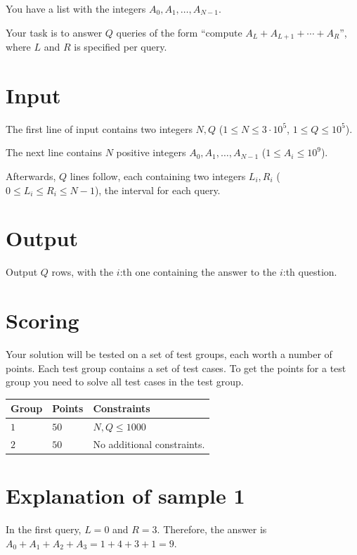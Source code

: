 You have a list with the integers $A_0, A_1, \dots, A_{N-1}$.

Your task is to answer $Q$ queries of the form ``compute $A_L+A_{L+1}+\cdots+A_{R}$'', where $L$ and $R$
is specified per query.

\section*{Input}
The first line of input contains two integers $N, Q$ ($1 \leq N \leq 3 \cdot 10^5$, $1 \leq Q \leq 10^5$).

The next line contains $N$ positive integers $A_0, A_1, \dots, A_{N-1}$ ($1 \leq A_i \leq 10^9$).

Afterwards, $Q$ lines follow, each containing two integers $L_{i},R_{i}$ ($0 \leq L_{i} \leq R_{i} \leq N-1$),
the interval for each query.

\section*{Output}
Output $Q$ rows, with the $i$:th one containing the answer to the $i$:th question.

\section*{Scoring}
Your solution will be tested on a set of test groups, each worth a number of points. Each test group contains
a set of test cases. To get the points for a test group you need to solve all test cases in the test group.

\noindent
\begin{tabular}{| l | l | p{12cm} |}
  \hline
  \textbf{Group} & \textbf{Points} & \textbf{Constraints} \\ \hline
  $1$    & $50$      & $N,Q \leq 1000$ \\ \hline
  $2$    & $50$      & No additional constraints. \\ \hline
\end{tabular}

\section*{Explanation of sample 1}
In the first query, $L=0$ and $R=3$. Therefore, the answer is $A_0+A_1+A_2+A_3=1+4+3+1=9$.
